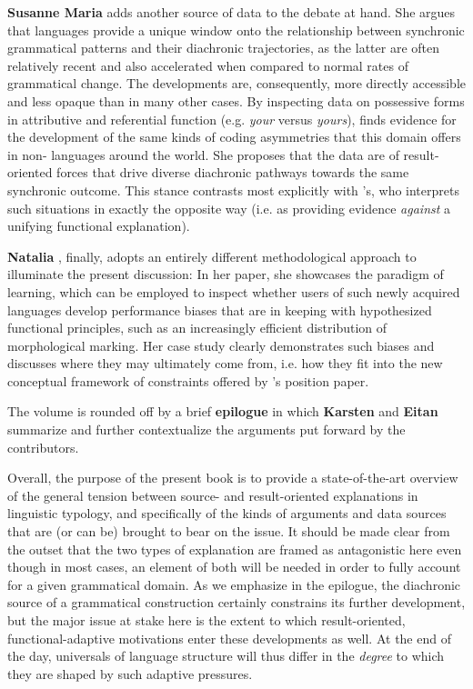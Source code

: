 \documentclass[output=paper]{langsci/langscibook}
\begin{document}
\textbf{Susanne Maria } adds another source of data to the debate at hand. She argues that  languages provide a unique window onto the relationship between synchronic grammatical patterns and their diachronic trajectories, as the latter are often relatively recent and also accelerated when compared to normal rates of grammatical change. The developments are, consequently, more directly accessible and less opaque than in many other cases. By inspecting  data on possessive forms in attributive and referential function (e.g. \textit{your} versus \textit{yours}),  finds evidence for the development of the same kinds of coding asymmetries that this domain offers in non- languages around the world. She proposes that the data are  of result-oriented forces that drive diverse diachronic pathways towards the same synchronic outcome. This stance contrasts most explicitly with ’s, who interprets such situations in exactly the opposite way (i.e. as providing evidence \textit{against} a unifying functional explanation).

\textbf{Natalia }, finally, adopts an entirely different methodological approach to illuminate the present discussion: In her paper, she showcases the paradigm of  learning, which can be employed to inspect whether users of such newly acquired languages develop performance biases that are in keeping with hypothesized functional principles, such as an increasingly efficient distribution of morphological marking. Her case study clearly demonstrates such biases and discusses where they may ultimately come from, i.e. how they fit into the new conceptual framework of constraints offered by ’s position paper.
\largerpage

The volume is rounded off by a brief \textbf{epilogue} in which \textbf{Karsten } and \textbf{Eitan } summarize and further contextualize the arguments put forward by the contributors. 

Overall, the purpose of the present book is to provide a state-of-the-art overview of the general tension between source- and result-oriented explanations in linguistic typology, and specifically of the kinds of arguments and data sources that are (or can be) brought to bear on the issue. It should be made clear from the outset that the two types of explanation are framed as antagonistic here even though in most cases, an element of both will be needed in order to fully account for a given grammatical domain. As we emphasize in the epilogue, the diachronic source of a grammatical construction certainly constrains its further development, but the major issue at stake here is the extent to which result-oriented, functional-adaptive motivations enter these developments as well. At the end of the day, universals of language structure will thus differ in the \textit{degree} to which they are shaped by such adaptive pressures.
\end{document}
